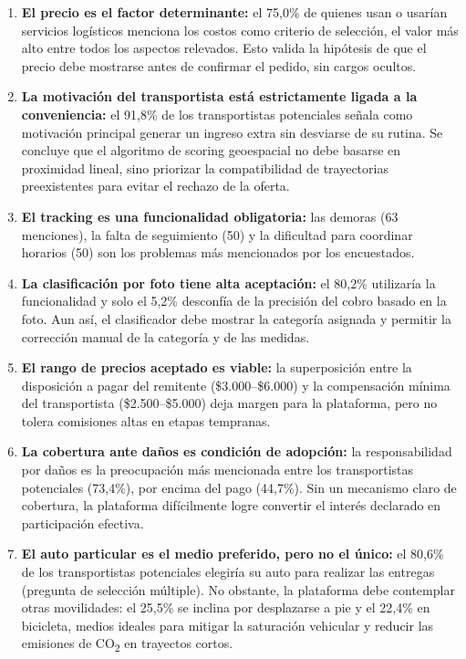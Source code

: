 \begin{enumerate}[leftmargin=2em]
	\item \textbf{El precio es el factor determinante:} el 75,0\% de quienes usan o usarían servicios logísticos menciona los costos como criterio de selección, el valor más alto entre todos los aspectos relevados. Esto valida la hipótesis de que el precio debe mostrarse antes de confirmar el pedido, sin cargos ocultos.
	\item \textbf{La motivación del transportista está estrictamente ligada a la conveniencia:} el 91,8\% de los transportistas potenciales señala como motivación principal generar un ingreso extra sin desviarse de su rutina. Se concluye que el algoritmo de scoring geoespacial no debe basarse en proximidad lineal, sino priorizar la compatibilidad de trayectorias preexistentes para evitar el rechazo de la oferta.
	\item \textbf{El tracking es una funcionalidad obligatoria:} las demoras (63 menciones), la falta de seguimiento (50) y la dificultad para coordinar horarios (50) son los problemas más mencionados por los encuestados.
	\item \textbf{La clasificación por foto tiene alta aceptación:} el 80,2\% utilizaría la funcionalidad y solo el 5,2\% desconfía de la precisión del cobro basado en la foto. Aun así, el clasificador debe mostrar la categoría asignada y permitir la corrección manual de la categoría y de las medidas.
	\item \textbf{El rango de precios aceptado es viable:} la superposición entre la disposición a pagar del remitente (\$3.000--\$6.000) y la compensación mínima del transportista (\$2.500--\$5.000) deja margen para la plataforma, pero no tolera comisiones altas en etapas tempranas.
	\item \textbf{La cobertura ante daños es condición de adopción:} la responsabilidad por daños es la preocupación más mencionada entre los transportistas potenciales (73,4\%), por encima del pago (44,7\%). Sin un mecanismo claro de cobertura, la plataforma difícilmente logre convertir el interés declarado en participación efectiva.
	\item \textbf{El auto particular es el medio preferido, pero no el único:} el 80,6\% de los transportistas potenciales elegiría su auto para realizar las entregas (pregunta de selección múltiple). No obstante, la plataforma debe contemplar otras movilidades: el 25,5\% se inclina por desplazarse a pie y el 22,4\% en bicicleta, medios ideales para mitigar la saturación vehicular y reducir las emisiones de CO\textsubscript{2} en trayectos cortos.
\end{enumerate}

